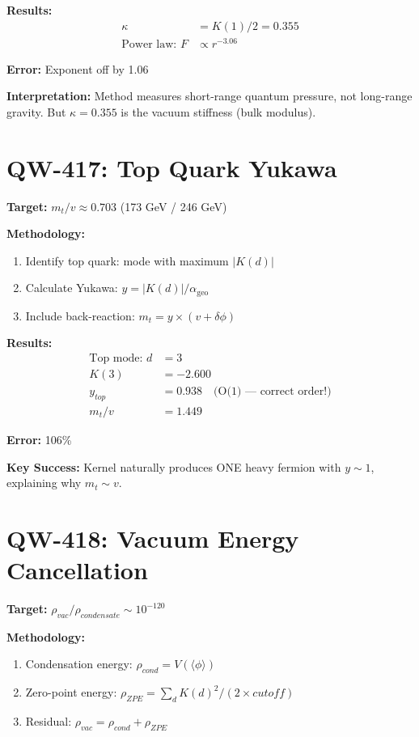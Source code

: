 \documentclass[11pt, a4paper]{article}
\theoremstyle{remark}
\newcommand{\alphageo}{\alpha_{\text{geo}}}
\begin{document}
\textbf{Results:}
\begin{align}
\kappa &= K(1)/2 = \mathbf{0.355} \\
\text{Power law: } F &\propto r^{-3.06}
\end{align}

\textbf{Error:} Exponent off by 1.06

\textbf{Interpretation:} Method measures short-range quantum pressure, not long-range gravity. But $\kappa = 0.355$ is the vacuum stiffness (bulk modulus).

\section{QW-417: Top Quark Yukawa}

\textbf{Target:} $m_t/v \approx 0.703$ (173 GeV / 246 GeV)

\textbf{Methodology:}
\begin{enumerate}
    \item Identify top quark: mode with maximum $|K(d)|$
    \item Calculate Yukawa: $y = |K(d)|/\alphageo$
    \item Include back-reaction: $m_t = y \times (v + \delta\phi)$
\end{enumerate}

\textbf{Results:}
\begin{align}
\text{Top mode: } d &= 3 \\
K(3) &= -2.600 \\
y_{top} &= \mathbf{0.938} \quad \text{(O(1) --- correct order!)} \\
m_t/v &= 1.449
\end{align}

\textbf{Error:} 106\%

\textbf{Key Success:} Kernel naturally produces ONE heavy fermion with $y \sim 1$, explaining why $m_t \sim v$.

\section{QW-418: Vacuum Energy Cancellation}

\textbf{Target:} $\rho_{vac}/\rho_{condensate} \sim 10^{-120}$

\textbf{Methodology:}
\begin{enumerate}
    \item Condensation energy: $\rho_{cond} = V(\langle\phi\rangle)$
    \item Zero-point energy: $\rho_{ZPE} = \sum_d K(d)^2 / (2 \times cutoff)$
    \item Residual: $\rho_{vac} = \rho_{cond} + \rho_{ZPE}$
\end{enumerate}
\end{document}
